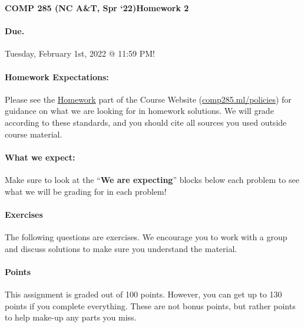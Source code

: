 \documentclass [12pt]{article}
\begin{document}
 

{\LARGE \textbf {COMP 285 (NC A\&T, Spr `22)}\hfill \textbf {Homework 2} } 
\vspace {1em} 
\begin {Instruction} 

\paragraph {Due.} Tuesday, February 1st, 2022 @ 11:59 PM!
\end {Instruction} 

\vspace {1em} 
\begin {Instruction} \paragraph {Homework Expectations:} Please see the \href{https://www.comp285.ml/homework/#general-homework-information}{Homework} part of the Course Website (\href{https://www.comp285.ml/policies/#collaboration-policy-and-honor-code}{comp285.ml/policies}) for guidance on what we are looking for in homework solutions. We will grade according to these standards, and you should cite all sources you used outside course material.

\paragraph {What we expect:} Make sure to look at the ``\textbf {We are expecting}'' blocks below each problem to see what we will be grading for in each problem! \end {Instruction}

\vspace {1em} 
\begin {Instruction} 

\paragraph {Exercises} The following questions are exercises. We encourage you to work with a group and discuss solutions to make sure you understand the material.

\paragraph {Points} This assignment is graded out of 100 points. However, you can get up to 130 points if you complete everything. These are not bonus points, but rather points to help make-up any parts you miss.

\end {Instruction} 
\end{document}
